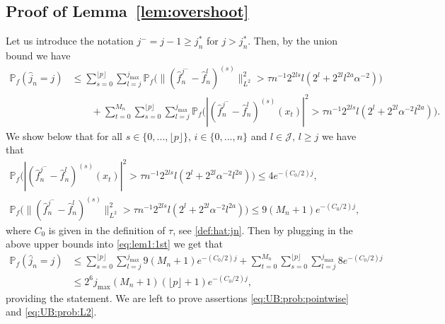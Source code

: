 \documentclass[preprint]{imsart}
\renewcommand{\P}{\mathbb{P}}
\numberwithin{equation}{section}
\begin{document}
\begin{appendix}
\subsection{Proof of Lemma~\ref{lem:overshoot}}

Let us introduce the notation $j^-=j-1\geq j_n^*$ for $j>j_n^*$. Then, by the union bound we have
\begin{align}
\P_f(\hat{j}_n=j)&\leq 
\sum_{s=0}^{\lfloor p \rfloor}\sum_{l= j}^{j_{\max}} \P_f \Big( \|(\hat{f}_n^{j^-} -\hat{f}_n^l)^{(s)}\|_{L^2}^2> \tau  n^{-1}2^{2ls}l (2^{l}+2^{2l}l^{2a}\alpha^{-2}) \Big)\nonumber\\
&\qquad  + \sum_{t=0}^{M_n}\sum_{s=0}^{\lfloor p \rfloor}\sum_{l= j}^{j_{\max}} \P_f \Big( |(\hat{f}_n^{j^-} -\hat{f}_n^l)^{(s)}(x_t)|^2> \tau  n^{-1}2^{2ls}l (2^{l}+2^{2l}\alpha^{-2}l^{2a}) \Big).
\label{eq:lem1:1st}
\end{align}
We show below that for all $s\in\{0,...,\lfloor p \rfloor\}$, $i\in \{0,...,n\}$ and ${l\in\mathcal{J},\, l\geq j}$ we have that
\begin{align}
 \P_f \Big( |(\hat{f}_n^{j^-} -\hat{f}_n^l)^{(s)}(x_t)|^2> \tau  n^{-1}2^{2ls}l (2^{l}+2^{2l}\alpha^{-2}l^{2a}) \Big)\leq 4 e^{-(C_0/2)j},\label{eq:UB:prob:pointwise}\\
 \P_f \Big( \|(\hat{f}_n^{j^-} -\hat{f}_n^l)^{(s)}\|_{L^2}^2> \tau  n^{-1}2^{2ls}l (2^{l}+2^{2l}\alpha^{-2}l^{2a}) \Big)\leq 9(M_n+1) e^{-(C_0/2)j},\label{eq:UB:prob:L2}
\end{align}
where $C_0$ is given in the definition of $\tau$, see \eqref{def:hat:jn}. Then by plugging in the above upper bounds into \eqref{eq:lem1:1st} we get that
\begin{align*}
\P_f(\hat{j}_n=j)&\leq  \sum_{s=0}^{\lfloor p \rfloor} \sum_{l= j}^{j_{\max}} 9(M_n+1) e^{-(C_0/2)j}+\sum_{t=0}^{M_n} \sum_{s=0}^{\lfloor p \rfloor} \sum_{l= j}^{j_{\max}}8e^{-(C_0/2)j}\\
&\leq 2^6 j_{\max}(M_n+1)(\lfloor p \rfloor +1)e^{-(C_0/2)j},
\end{align*}
providing the statement. We are left to prove assertions  \eqref{eq:UB:prob:pointwise} and \eqref{eq:UB:prob:L2}.


\end{appendix}
\end{document}
